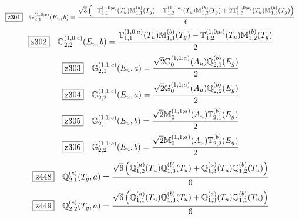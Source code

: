 \documentclass[fleqn,10pt,landscape]{jsarticle}
\begin{document}
\begin{dmath*}
\hspace*{3mm}\fbox{z301}\quad \mathbb{G}_{2,1}^{(1,0;c)}(E_{u},b)=\frac{\sqrt{3} \left(- \mathbb{T}_{1,1}^{(1,0;a)}(T_{u}) \mathbb{M}_{1,1}^{(b)}(T_{g}) - \mathbb{T}_{1,2}^{(1,0;a)}(T_{u}) \mathbb{M}_{1,2}^{(b)}(T_{g}) + 2 \mathbb{T}_{1,3}^{(1,0;a)}(T_{u}) \mathbb{M}_{1,3}^{(b)}(T_{g})\right)}{6}
\end{dmath*}
\begin{dmath*}
\hspace*{3mm}\fbox{z302}\quad \mathbb{G}_{2,2}^{(1,0;c)}(E_{u},b)=\frac{\mathbb{T}_{1,1}^{(1,0;a)}(T_{u}) \mathbb{M}_{1,1}^{(b)}(T_{g}) - \mathbb{T}_{1,2}^{(1,0;a)}(T_{u}) \mathbb{M}_{1,2}^{(b)}(T_{g})}{2}
\end{dmath*}
\begin{dmath*}
\hspace*{3mm}\fbox{z303}\quad \mathbb{G}_{2,1}^{(1,1;c)}(E_{u},a)=\frac{\sqrt{2} \mathbb{G}_{0}^{(1,1;a)}(A_{u}) \mathbb{Q}_{2,1}^{(b)}(E_{g})}{2}
\end{dmath*}
\begin{dmath*}
\hspace*{3mm}\fbox{z304}\quad \mathbb{G}_{2,2}^{(1,1;c)}(E_{u},a)=\frac{\sqrt{2} \mathbb{G}_{0}^{(1,1;a)}(A_{u}) \mathbb{Q}_{2,2}^{(b)}(E_{g})}{2}
\end{dmath*}
\begin{dmath*}
\hspace*{3mm}\fbox{z305}\quad \mathbb{G}_{2,1}^{(1,1;c)}(E_{u},b)=\frac{\sqrt{2} \mathbb{M}_{0}^{(1,1;a)}(A_{u}) \mathbb{T}_{2,1}^{(b)}(E_{g})}{2}
\end{dmath*}
\begin{dmath*}
\hspace*{3mm}\fbox{z306}\quad \mathbb{G}_{2,2}^{(1,1;c)}(E_{u},b)=\frac{\sqrt{2} \mathbb{M}_{0}^{(1,1;a)}(A_{u}) \mathbb{T}_{2,2}^{(b)}(E_{g})}{2}
\end{dmath*}
\begin{dmath*}
\hspace*{3mm}\fbox{z448}\quad \mathbb{Q}_{2,1}^{(c)}(T_{g},a)=\frac{\sqrt{6} \left(\mathbb{Q}_{1,2}^{(a)}(T_{u}) \mathbb{Q}_{1,3}^{(b)}(T_{u}) + \mathbb{Q}_{1,3}^{(a)}(T_{u}) \mathbb{Q}_{1,2}^{(b)}(T_{u})\right)}{6}
\end{dmath*}
\begin{dmath*}
\hspace*{3mm}\fbox{z449}\quad \mathbb{Q}_{2,2}^{(c)}(T_{g},a)=\frac{\sqrt{6} \left(\mathbb{Q}_{1,1}^{(a)}(T_{u}) \mathbb{Q}_{1,3}^{(b)}(T_{u}) + \mathbb{Q}_{1,3}^{(a)}(T_{u}) \mathbb{Q}_{1,1}^{(b)}(T_{u})\right)}{6}
\end{dmath*}
\end{document}
